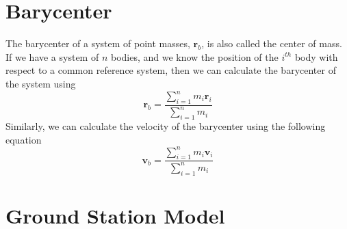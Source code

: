 \section{  Barycenter } 

The barycenter of a system of point masses, $\mathbf{r}_b$, is also
called the center of mass.  If we have a system of $n$ bodies, and
we know the position of the $i^{th}$ body with respect to a common
reference system, then we can calculate the barycenter of the system
using
%
\begin{equation}
     \mathbf{r}_b = \displaystyle\frac{\displaystyle\sum_{i=1}^n m_i \mathbf{r}_i}{\displaystyle\sum_{i=1}^n m_i}
\end{equation}
%
Similarly, we can calculate the velocity of the barycenter using the
following equation
%
\begin{equation}
     \mathbf{v}_b = \displaystyle\frac{\displaystyle\sum_{i=1}^n m_i \mathbf{v}_i}{\displaystyle\sum_{i=1}^n m_i}
\end{equation}

\section{Ground Station Model}

